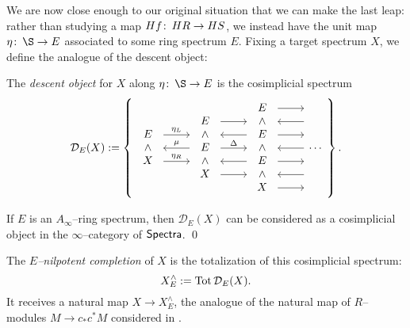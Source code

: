 We are now close enough to our original situation that we can make the last leap: rather than studying a map $Hf\colon\thinspace HR \to HS$, we instead have the unit map $\eta\co \S \to E$ associated to some ring spectrum $E$.  Fixing a target spectrum $X$, we define the analogue of the descent object:
\begin{definition}
The \textit{descent object} for $X$ along $\eta\co \S \to E$ is the cosimplicial spectrum
\[\mathcal{D}_E(X) := \left\{
\begin{tikzcd}
\begin{array}{c} E \\ \sm \\ X \end{array} \arrow[leftarrow]{r}{\mu} \arrow[shift left=(\baselineskip)]{r}{\eta_L} \arrow[shift right=\baselineskip]{r}{\eta_R} &
\begin{array}{c} E \\ \sm \\ E \\ \sm \\ X \end{array} \arrow[shift left=(2*\baselineskip)]{r} \arrow[leftarrow, shift left=(\baselineskip)]{r} \arrow{r}{\Delta} \arrow[leftarrow, shift right=(\baselineskip)]{r} \arrow[shift right=(2*\baselineskip)]{r} &
\begin{array}{c} E \\ \sm \\ E \\ \sm \\ E \\ \sm \\ X \end{array} \arrow[shift left=(3*\baselineskip)]{r} \arrow[leftarrow, shift left=(2*\baselineskip)]{r} \arrow[shift left=(\baselineskip)]{r} \arrow[leftarrow]{r} \arrow[shift right=(\baselineskip)]{r} \arrow[leftarrow, shift right=(2*\baselineskip)]{r} \arrow[shift right=(3*\baselineskip)]{r} &
\cdots
\end{tikzcd}
\right\}.\]
\end{definition}

\begin{lemma}
If $E$ is an $A_\infty$--ring spectrum, then $\mathcal D_E(X)$ can be considered as a cosimplicial object in the $\infty$--category of $\mathsf{Spectra}$. \qed
\end{lemma}

\begin{definition}\label{DefnOfNilpCompletionAndASS}
The \textit{$E$--nilpotent completion} of $X$ is the totalization of this cosimplicial spectrum: \[X^\wedge_E := \operatorname{Tot} \mathcal D_E(X).\]  It receives a natural map $X \to X^\wedge_E$, the analogue of the natural map of $R$--modules $M \to c_* c^* M$ considered in .
\end{definition}

